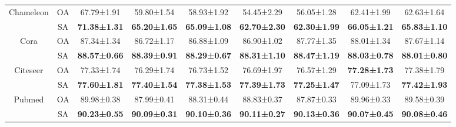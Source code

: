 \documentclass{article}
\theoremstyle{plain}
\theoremstyle{definition}
\theoremstyle{remark}
\newcommand{\std}{\scriptsize{}}
\begin{document}
\begin{table}[ht!]
\begin{tabular}{cc cccc ccc}
        \midrule \multirow{2}{*}{Chameleon}
        & OA   &  67.79\std{±1.91} & 59.80\std{±1.54} & 58.93\std{±1.92} & 54.45\std{±2.29} & 56.05\std{±1.28} & 62.41\std{±1.99} & 62.63\std{±1.64}\\
        & SA   &  \textbf{71.38\std{±1.31}} & \textbf{65.20\std{±1.65}} & \textbf{65.09\std{±1.08}} & \textbf{62.70\std{±2.30}} & \textbf{62.30\std{±1.99}} & \textbf{66.05\std{±1.21}} & \textbf{65.83\std{±1.10}}\\
        \midrule \multirow{2}{*}{Cora}
        & OA   &  87.34\std{±1.34} & 86.72\std{±1.17} & 86.88\std{±1.09} & 86.90\std{±1.02} & 87.77\std{±1.35} & 88.01\std{±1.34} & 87.67\std{±1.14}\\
        & SA   &  \textbf{88.57\std{±0.66}} & \textbf{88.39\std{±0.91}} & \textbf{88.29\std{±0.67}} & \textbf{88.31\std{±1.10}} & \textbf{88.47\std{±1.19}} & \textbf{88.03\std{±0.78}} & \textbf{88.01\std{±0.80}}\\
        \midrule \multirow{2}{*}{Citeseer}
        & OA   &  77.33\std{±1.74} & 76.29\std{±1.74} & 76.73\std{±1.52} & 76.69\std{±1.97} & 76.57\std{±1.29} & \textbf{77.28\std{±1.73}} & 77.38\std{±1.79}\\
        & SA   &  \textbf{77.60\std{±1.81}} & \textbf{77.40\std{±1.54}} & \textbf{77.38\std{±1.53}} & \textbf{77.39\std{±1.73}} & \textbf{77.25\std{±1.47}} & 77.09\std{±1.73} & \textbf{77.42\std{±1.93}}\\
        \midrule \multirow{2}{*}{Pubmed}
        & OA   &  89.98\std{±0.38} & 87.99\std{±0.41} & 88.31\std{±0.44} & 88.83\std{±0.37} & 87.87\std{±0.33} & 89.96\std{±0.33} & 89.58\std{±0.39}\\
        & SA   &  \textbf{90.23\std{±0.55}} & \textbf{90.09\std{±0.31}} & \textbf{90.10\std{±0.36}} & \textbf{90.11\std{±0.27}} & \textbf{90.13\std{±0.36}} & \textbf{90.07\std{±0.45}} & \textbf{90.08\std{±0.46}}\\
        \bottomrule
     \end{tabular}
 \end{table}
\end{document}
